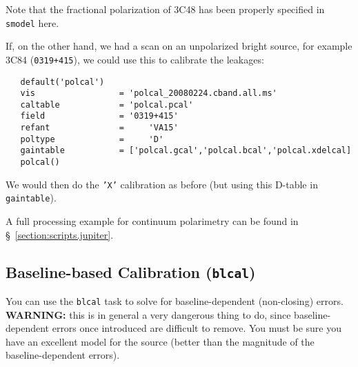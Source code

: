 {Note that the fractional polarization of 3C48 has been properly specified 
in {\tt smodel} here.


If, on the other hand, we had a scan on an unpolarized bright source,
for example 3C84 ({\tt 0319+415}), we could use this to calibrate the
leakages:
\small
\begin{verbatim}
   default('polcal')
   vis                 = 'polcal_20080224.cband.all.ms'
   caltable            = 'polcal.pcal'
   field               = '0319+415'
   refant              =     'VA15'        
   poltype             =     'D'        
   gaintable           = ['polcal.gcal','polcal.bcal','polcal.xdelcal]
   polcal()
\end{verbatim}
\normalsize
We would then do the {\tt 'X'} calibration as before (but using this
D-table in {\tt gaintable}).

A full processing example for continuum polarimetry can be found
in \S~\ref{section:scripts.jupiter}.

\subsection{Baseline-based Calibration ({\tt blcal})}
\label{section:cal.solve.blcal}

You can use the {\tt blcal} task to solve for baseline-dependent
(non-closing) errors.  {\bf WARNING:} this is in general a very dangerous
thing to do, since baseline-dependent errors once introduced are
difficult to remove.  You must be sure you have an excellent model
for the source (better than the magnitude of the baseline-dependent
errors).

}
